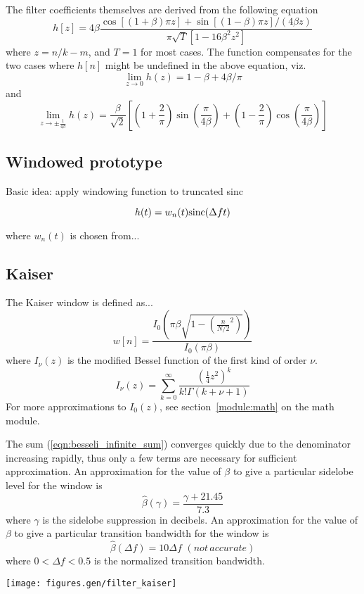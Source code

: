 The filter coefficients themselves are derived from the following equation
\[ 
    h\left[z\right] =
      4\beta \frac{ \cos\left[(1+\beta)\pi z\right] +
                    \sin\left[(1-\beta)\pi z\right] / (4\beta z) }
                  { \pi \sqrt{T}\left[ 1-16\beta^2z^2\right] }
\]
where $z=n/k-m$, and $T=1$ for most cases.
The function compensates for the two cases where $h[n]$ might be
undefined in the above equation, viz.
\[
    \mathop {\lim }\limits_{z \to 0 } h(z) = 1 - \beta + 4\beta/\pi
\]
and
\[
    \mathop {\lim }\limits_{z \to \pm \frac{1}{4\beta} } h(z) =
        \frac{\beta}{\sqrt{2}}
        \left[
            \left(1 + \frac{2}{\pi}\right)\sin\left(\frac{\pi}{4\beta}\right) +
            \left(1 - \frac{2}{\pi}\right)\cos\left(\frac{\pi}{4\beta}\right)
        \right]
\]

\subsection{Windowed prototype}
\label{ch:filterdesign:window}

Basic idea: apply windowing function to truncated sinc

\begin{equation}
h(t) = w_n(t) \textup{sinc}(\Delta f t)
\end{equation}

where $w_n(t)$ is chosen from...

\subsection{Kaiser}
\label{ch:filterdesign:window:kaiser}
The Kaiser window is defined as...
\begin{equation}
\label{eqn:kaiser_window}
    w[n] = \frac{
        I_0\left(\pi\beta\sqrt{1-\left(\frac{n}{N/2}^2\right)}\right)
    }{
        I_0\left(\pi\beta\right)
    }
\end{equation}
where $I_\nu(z)$ is the modified Bessel function of the first kind of order
$\nu$.
\begin{equation}
\label{eqn:besseli_infinite_sum}
    I_\nu(z) = \sum_{k=0}^{\infty}{
        \frac{
            \left(\frac{1}{4}z^2\right)^k
        }{
            k!\Gamma(k+\nu+1)
        }
    }
\end{equation}
For more approximations to $I_0(z)$, see section~\ref{module:math} on the math
module.

The sum (\ref{eqn:besseli_infinite_sum}) converges quickly due to the
denominator increasing rapidly, thus only a few terms are necessary for
sufficient approximation.
An approximation for the value of $\beta$ to give a particular sidelobe level
for the window is
\begin{equation}
    \hat{\beta}(\gamma) = \frac{\gamma + 21.45}{7.3}
\end{equation}
where $\gamma$ is the sidelobe suppression in decibels.
An approximation for the value of $\beta$ to give a particular transition
bandwidth for the window is
\begin{equation}
    \hat{\beta}(\Delta f) = 10\Delta f \,\, (not\, accurate)
\end{equation}
where $0 < \Delta f < 0.5$ is the normalized transition bandwidth.


\texttt{[image: figures.gen/filter\_kaiser]}


